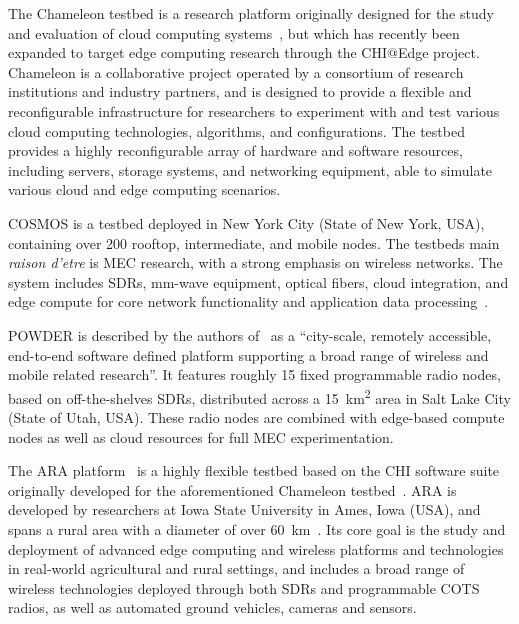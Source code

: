 The Chameleon testbed is a research platform originally designed for the study and evaluation of cloud computing systems~\cite{keahey2020lessons}, but which has recently been expanded to target edge computing research through the \acs{CHI}@Edge project.
Chameleon is a collaborative project operated by a consortium of research institutions and industry partners, and is designed to provide a flexible and reconfigurable infrastructure for researchers to experiment with and test various cloud computing technologies, algorithms, and configurations.
The testbed provides a highly reconfigurable array of hardware and software resources, including servers, storage systems, and networking equipment, able to simulate various cloud and edge computing scenarios.

\gls{COSMOS} is a testbed deployed in New York City (State of New York, \gls{USA}), containing over \num{200} rooftop, intermediate, and mobile nodes.
The testbeds main \emph{raison d'etre} is \gls{MEC} research, with a strong emphasis on wireless networks.
The system includes \glspl{SDR}, \si{\milli\meter}-wave equipment, optical fibers, cloud integration, and edge compute for core network functionality and application data processing~\cite{yu2019cosmos,raychaudhuri2020challenge}.

\gls{POWDER} is described by the authors of~\cite{breen2020powder} as a ``city-scale, remotely accessible, end-to-end software defined platform supporting a broad range of wireless and mobile related research''.
It features roughly \num{15} fixed programmable radio nodes, based on off-the-shelves \glspl{SDR}, distributed across a \SI{15}{\kilo\meter\squared} area in Salt Lake City (State of Utah, \gls{USA}).
These radio nodes are combined with edge-based compute nodes as well as cloud resources for full \gls{MEC} experimentation.

The \gls{ARA} platform~\cite{zhang2022ara} is a highly flexible testbed based on the \gls{CHI} software suite originally developed for the aforementioned Chameleon testbed~\cite{keahey2020lessons}.
\gls{ARA} is developed by researchers at Iowa State University in Ames, Iowa (\gls{USA}), and spans a rural area with a diameter of over \SI{60}{\kilo\meter}~\cite{zhang2022ara}.
Its core goal is the study and deployment of advanced edge computing and wireless platforms and technologies in real-world agricultural and rural settings, and includes a broad range of wireless technologies deployed through both \glspl{SDR} and programmable \gls{COTS} radios, as well as automated ground vehicles, cameras and sensors.

